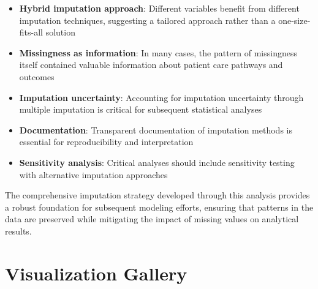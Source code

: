 \begin{itemize}
    \item \textbf{Hybrid imputation approach}: Different variables benefit from different imputation techniques, suggesting a tailored approach rather than a one-size-fits-all solution
    
    \item \textbf{Missingness as information}: In many cases, the pattern of missingness itself contained valuable information about patient care pathways and outcomes
    
    \item \textbf{Imputation uncertainty}: Accounting for imputation uncertainty through multiple imputation is critical for subsequent statistical analyses
    
    \item \textbf{Documentation}: Transparent documentation of imputation methods is essential for reproducibility and interpretation
    
    \item \textbf{Sensitivity analysis}: Critical analyses should include sensitivity testing with alternative imputation approaches
\end{itemize}

The comprehensive imputation strategy developed through this analysis provides a robust foundation for subsequent modeling efforts, ensuring that patterns in the data are preserved while mitigating the impact of missing values on analytical results.

\section{Visualization Gallery}
\label{sec:visualizations}




